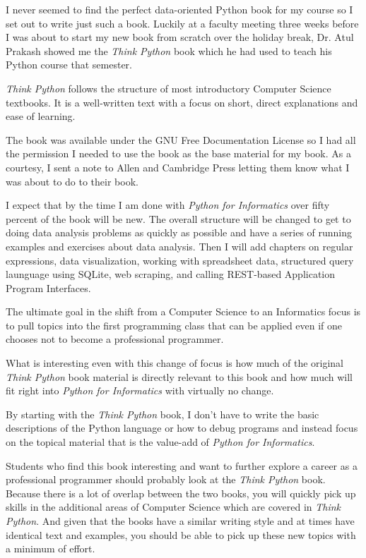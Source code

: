\documentclass[10pt]{book}
\begin{document}
I never seemed to find the perfect data-oriented Python
book for my course so I set out 
to write just such a book.  Luckily at a faculty meeting three weeks
before I was about to start my new book from scratch over 
the holiday break, 
Dr. Atul Prakash showed me the {\em Think Python} book which he had
used to teach his Python course that semester.

{\em Think Python} follows the structure of most introductory Computer
Science textbooks.  It is a well-written text with a focus on 
short, direct explanations and ease of learning.  

The book was available under the 
GNU Free Documentation License 
so I had all the permission I needed
to use the book as the base material for my book.  As a courtesy, 
I sent a note to Allen and Cambridge Press letting them know what I 
was about to do to their book.

I expect that by the time I am done with {\em Python for Informatics} 
over fifty percent of the book will be new.  The overall structure
will be changed to get to doing data analysis problems as quickly as
possible and have a series of running examples and exercises 
about data analysis.
Then I will add chapters on regular expressions, data
visualization, working with spreadsheet data, structured 
query launguage using SQLite, web scraping, and calling REST-based
Application Program Interfaces.  

The ultimate goal in the shift from a Computer Science to an Informatics
focus is to pull topics into the first programming class that can 
be applied even if one chooses not to become a professional programmer.

What is interesting even with this change of focus 
is how much of the original {\em Think Python} book
material is directly relevant to this book and how much will fit
right into {\em Python for Informatics} with virtually no change.

By starting with the {\em Think Python} book, I don't have to write the
basic descriptions of the Python language or how to debug programs
and instead focus on the topical material that is the value-add
of {\em Python for Informatics}.

Students who find this book interesting and want to further explore
a career as a professional programmer should probably look at 
the {\em Think Python} book.  Because there
is a lot of overlap between the two books, 
you will quickly pick up skills in the additional
areas of Computer Science which are covered in {\em Think Python}.
And given that the books have a similar writing style and at times
have identical text and examples, you should be 
able to pick up these new topics with a minimum of effort.
\end{document}

